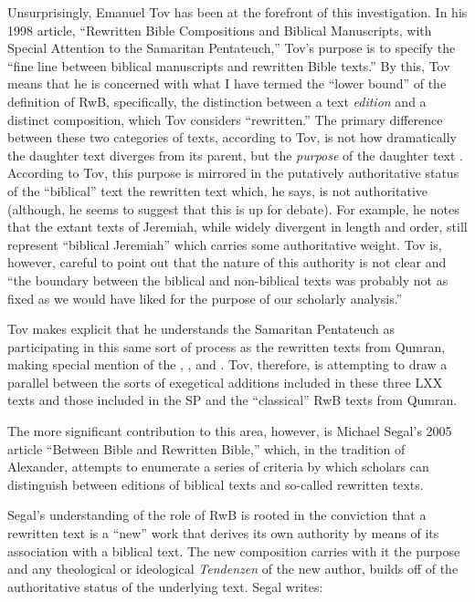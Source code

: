 Unsurprisingly, Emanuel Tov has been at the forefront of this investigation. In his 1998 article, ``Rewritten Bible Compositions and Biblical Manuscripts, with Special Attention to the Samaritan Pentateuch,'' Tov's purpose is to specify the ``fine line between biblical manuscripts and rewritten Bible texts.''\autocite[334]{tov_dsd1998} By this, Tov means that he is concerned with what I have termed the ``lower bound'' of the definition of RwB, specifically, the distinction between a text \emph{edition} and a distinct composition, which Tov considers ``rewritten.'' The primary difference between these two categories of texts, according to Tov, is not how dramatically the daughter text diverges from its parent, but the \emph{purpose} of the daughter text \autocite[334]{tov_dsd1998}. According to Tov, this purpose is mirrored in the putatively authoritative status of the ``biblical'' text \visavis the rewritten text which, he says, is not authoritative (although, he seems to suggest that this is up for debate\autocite[337]{tov_dsd1998}). For example, he notes that the extant texts of Jeremiah, while widely divergent in length and order, still represent ``biblical Jeremiah'' which carries some authoritative weight. Tov is, however, careful to point out that the nature of this authority is not clear and ``the boundary between the biblical and non-biblical texts was probably not as fixed as we would have liked for the purpose of our scholarly analysis.''\autocite[335]{tov_dsd1998} 

Tov makes explicit that he understands the Samaritan Pentateuch as participating in this same sort of process as the rewritten texts from Qumran, making special mention of the \templescroll, \ga, and \jub. Tov, therefore, is attempting to draw a parallel between the sorts of exegetical additions included in these three LXX texts and those included in the SP and the ``classical'' RwB texts from Qumran. 

The more significant contribution to this area, however, is Michael Segal's 2005 article ``Between Bible and Rewritten Bible,'' which, in the tradition of Alexander, attempts to enumerate a series of criteria by which scholars can distinguish between editions of biblical texts and so-called rewritten texts. 

Segal's understanding of the role of RwB is rooted in the conviction that a rewritten text is a ``new'' work that derives its own authority by means of its association with a biblical text. The new composition carries with it the purpose and any theological or ideological \emph{Tendenzen} of the new author, builds off of the authoritative status of the underlying text.\autocite[11]{segal_henze2005} Segal writes: 

